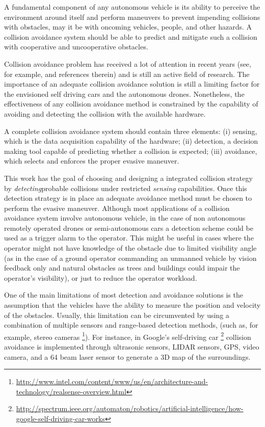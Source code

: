 \documentclass[]{aiaa-tc}%
\begin{document}
A fundamental component of any autonomous vehicle is its ability to perceive the environment around itself and perform maneuvers to prevent impending collisions with obstacles, may it be with  oncoming vehicles, people, and other hazards. A collision avoidance system should be able to predict and mitigate such a collision with cooperative and uncooperative obstacles.

Collision avoidance problem has received a lot of attention in recent years (see, for example, \cite{khatib96,chakravarthy98,carbone08,smith08,sti10,shankaran2011collision,rodriguez2011collision,mikaCA, gusrialdi2008coverage,laventall2008coverage} and references therein) and is still an active field of research. The importance of an adequate collision avoidance solution is still a limiting factor for the envisioned self driving cars and the autonomous drones.  Nonetheless, the effectiveness of any collision avoidance method is constrained by the capability of avoiding and detecting the collision with the available hardware.

A complete collision avoidance system should contain three elements: (i) sensing, which is the data acquisition capability of the hardware; (ii) detection, a decision making tool capable of predicting whether a collision is expected; (iii) avoidance, which selects and enforces the proper evasive maneuver.

This work has the goal of choosing and designing a integrated collision strategy by {\em detecting}\/probable collisions under restricted {\em sensing}\/ capabilities. Once this detection strategy is in place an adequate avoidance method must be chosen to perform the evasive maneuver. Although most applications of a collision avoidance system involve autonomous vehicle, in the case of non autonomous remotely operated drones or semi-autonomous cars a detection scheme could be used as a trigger alarm to the operator. This might be useful in cases where the operator might not have knowledge of the obstacle due to limited visibility angle (as in the case of a ground operator commanding an unmanned vehicle by vision feedback only and natural obstacles as trees and buildings could impair the operator’s visibility), or just to reduce the operator workload.

One of the main limitations of most detection and avoidance solutions is the assumption that the vehicles have the ability to measure the position and velocity of the obstacles. Usually, this limitation can be circumvented by using a combination of multiple sensors and range-based detection methods, (such as, for example, stereo cameras \cite{BarryT14}  \footnote{\url{http://www.intel.com/content/www/us/en/architecture-and-technology/realsense-overview.html}}). For instance, in Google's self-driving car \cite{rathod2013autonomous} \footnote{\url{http://spectrum.ieee.org/automaton/robotics/artificial-intelligence/how-google-self-driving-car-works}} collision avoidance is implemented through ultrasonic sensors, LIDAR sensors, GPS, video camera, and a 64 beam laser sensor to generate a 3D map of the surroundings.
\end{document}
